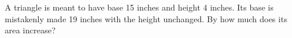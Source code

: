 A triangle is meant to have base 15 inches and height 4 inches. Its base is mistakenly made 19 inches with the height unchanged. By how much does its area increase?

